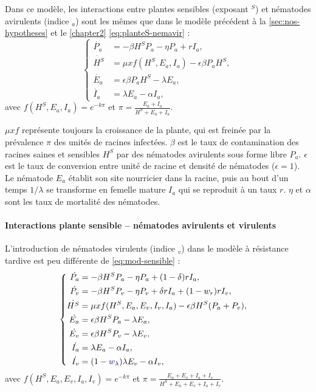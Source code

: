 Dans ce modèle, les interactions entre plantes sensibles (exposant $^S$) et nématodes avirulents (indice $_a$) sont les mêmes que dans le modèle précédent à la \autoref{sec:nos-hypotheses}  et le \autoref{chapter2} \eqref{eq:planteS-nemavir} :
\begin{equation*}
  \left\{
    \begin{aligned}
      \dot{P_a} &=- \beta H^S P_a - \eta P_a + r I_a,\\
      \dot{H^S} &= \mu x f(H^S,E_a,I_a)- \epsilon \beta P_a H^S,\\
      \dot{E_a} &= \epsilon \beta P_a H^S- \lambda E_a,\\
      \dot{I_a} &= \lambda E_a - \alpha I_a,
    \end{aligned}
  \right.
\end{equation*}
avec $f(H^S,E_a,I_a)= e^{-k \pi}$ et $\pi=\frac{E_a +I_a}{H^S+E_a+I_a}$.

$\mu x f$ représente toujours la croissance de la plante, qui est freinée par la prévalence $\pi$ des unités de racines infectées. $\beta$ est le taux de contamination des racines saines et sensibles $H^S$ par des nématodes avirulents sous forme libre $P_a$. $\epsilon$ est le taux de conversion entre unité de racine et densité de nématodes ($\epsilon=1$). Le nématode $E_a$ établit son site nourricier dans la racine, puis au bout d'un temps $1/\lambda$ se transforme en femelle mature $I_a$ qui se reproduit à un taux $r$. $\eta$ et $\alpha$ sont les taux de mortalité des nématodes.

\paragraph{Interactions plante sensible --   nématodes avirulents et virulents}

L'introduction de nématodes virulents (indice $_v$) dans le modèle à résistance tardive est peu différente de \eqref{eq:mod-sensible} : 
\begin{equation}
  \left\{
    \begin{aligned}
      \dot{P_a} &=- \beta H^S P_a - \eta P_a + (1-\delta) r I_a,&\\
      \dot{P_v} &=- \beta H^S P_v - \eta P_v + \delta r I_a + (1-w_{r}) r I_v,\\
      \dot{H^S} &= \mu x f(H^S,E_a,E_v,I_v,I_a) - \epsilon \beta H^S (P_a + P_v),\\
      \dot{E_a} &= \epsilon \beta H^S P_a - \lambda E_a,\\
      \dot{E_v} &= \epsilon \beta H^S P_v - \lambda E_v,\\
      \dot{I_a} &= \lambda E_a - \alpha I_a,\\
      \dot{I_v} &= (1-\textcolor{navyblue}{w_{\lambda}}) \lambda E_v -\alpha I_v,
    \end{aligned}
  \right.
  \label{eq:planteS-nemav}
\end{equation}
avec $f(H^S,E_a,E_v,I_a,I_v)= e^{-k \pi}$ et $\pi=\frac{E_a+E_v+I_a+I_v}{H^S+E_a+E_v+I_a+I_v}$.

